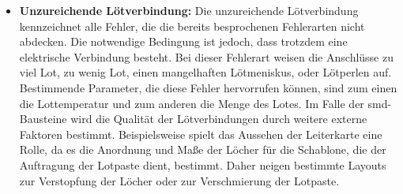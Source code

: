 \begin{itemize}
            \item \textbf{Unzureichende Lötverbindung:} Die unzureichende Lötverbindung kennzeichnet alle Fehler, die die bereits besprochenen Fehlerarten nicht abdecken. Die notwendige Bedingung ist jedoch, dass trotzdem eine elektrische Verbindung besteht. Bei dieser Fehlerart weisen die Anschlüsse zu viel Lot, zu wenig Lot, einen mangelhaften Lötmeniskus, oder Lötperlen auf. Bestimmende Parameter, die diese Fehler hervorrufen können, sind zum einen die Lottemperatur und zum anderen die Menge des Lotes. Im Falle der \ac{smd}-Bausteine wird die Qualität der Lötverbindungen durch weitere externe Faktoren bestimmt. Beispielsweise spielt das Aussehen der Leiterkarte eine Rolle, da es die Anordnung und Maße der Löcher für die Schablone, die der Auftragung der Lotpaste dient, bestimmt. Daher neigen bestimmte Layouts zur Verstopfung der Löcher oder zur Verschmierung der Lotpaste. \cite{berger_test-_2012}
        \end{itemize}